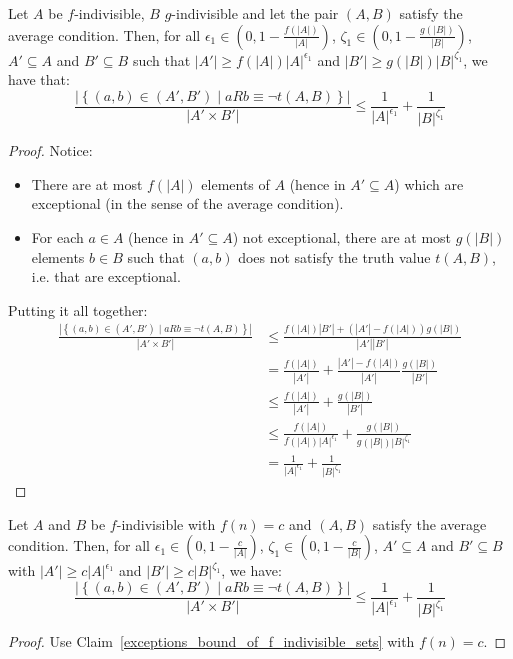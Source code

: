     \label{exceptions_bound_of_f_indivisible_sets}
        Let $A$ be $f$-indivisible, $B$ $g$-indivisible and let the pair $(A,B)$ satisfy the average condition.
        Then, for all $\epsilon_1 \in \left( 0, 1-\frac{f(|A|)}{|A|} \right)$, $\zeta_1 \in \left( 0, 1-\frac{g(|B|)}{|B|} \right)$, $A' \subseteq A$
            and $B' \subseteq B$ such that $|A'| \geq f(|A|) |A|^{\epsilon_1}$ and $|B'| \geq g(|B|) |B|^{\zeta_1}$,
            we have that:
        \[
            \frac{|\left\{ (a,b) \in (A',B') \mid a R b \equiv \neg t(A,B) \right\}|}{|A' \times B'|} \leq
                \frac{1}{|A|^{\epsilon_1}} + \frac{1}{|B|^{\zeta_1}}
        \]
        \begin{proof}
            Notice:
            \begin{itemize}
                \item There are at most $f(|A|)$ elements of $A$ (hence in $A' \subseteq A$) which are exceptional
                    (in the sense of the average condition).
                \item For each $a \in A$ (hence in $A' \subseteq A$) not exceptional, there are at most $g(|B|)$ elements
                    $b \in B$ such that $(a,b)$ does not satisfy the truth value $t(A,B)$, i.e. that are exceptional.
            \end{itemize}
            Putting it all together:
            \[
                \begin{split}
                    \frac{|\left\{ (a,b) \in (A',B') \mid a R b \equiv \neg t(A,B) \right\}|}{|A' \times B'|}
                        &\leq \frac{f(|A|) |B'| + (|A'| - f(|A|)) g(|B|)}{|A'| |B'|} \\
                        &= \frac{f(|A|)}{|A'|} + \frac{|A'| - f(|A|)}{|A'|} \frac{g(|B|)}{|B'|} \\
                        &\leq \frac{f(|A|)}{|A'|} + \frac{g(|B|)}{|B'|} \\
                        &\leq \frac{f(|A|)}{f(|A|) |A|^{\epsilon_1}} + \frac{g(|B|)}{g(|B|) |B|^{\zeta_1}} \\
                        &= \frac{1}{|A|^{\epsilon_1}} + \frac{1}{|B|^{\zeta_1}}
                \end{split}
            \]
        \end{proof}

    \corollary[Corollary 4.9]
        Let $A$ and $B$ be $f$-indivisible with $f(n) = c$ and $(A,B)$ satisfy the average condition.
        Then, for all $\epsilon_1 \in (0, 1 - \frac{c}{|A|})$, $\zeta_1 \in (0, 1 - \frac{c}{|B|})$, $A' \subseteq A$ and
            $B' \subseteq B$ with $|A'| \geq c |A|^{\epsilon_1}$ and $|B'| \geq c |B|^{\zeta_1}$, we have:
        \[
            \frac{|\left\{ (a,b) \in (A',B') \mid a R b \equiv \neg t(A,B) \right\}|}{|A' \times B'|} \leq
                \frac{1}{|A|^{\epsilon_1}} + \frac{1}{|B|^{\zeta_1}}
        \]
        \begin{proof}
            Use Claim~\ref{exceptions_bound_of_f_indivisible_sets} with $f(n) = c$.
        \end{proof}

